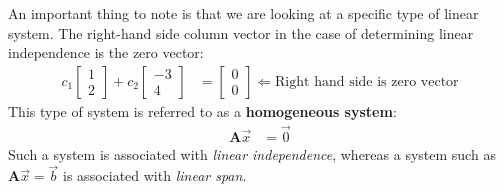 \documentclass[11pt]{article}
\newcommand{\keyphrase}{\textbf}
\newcommand{\mat}[1]{\mathbf{#1}}
\newcommand{\vek}[1]{\vec{#1}}
\begin{document}
An important thing to note is that we are looking at a specific type of linear system. The right-hand side column vector in the case of determining linear independence is the zero vector:
\begin{align*}
c_1 \begin{bmatrix}1\\2\end{bmatrix} +
c_2 \begin{bmatrix}-3\\4\end{bmatrix}
&= \begin{bmatrix}0\\0\end{bmatrix} \Leftarrow \text{Right hand side is zero vector}
\end{align*}
This type of system is referred to as a \keyphrase{homogeneous system}:
\begin{align*}
\mat{A} \vek{x} &= \vek{0}
\end{align*}
Such a system is associated with \emph{linear independence}, whereas a system such as $\mat{A} \vek{x} = \vek{b}$ is associated with \emph{linear span}.
\end{document}
